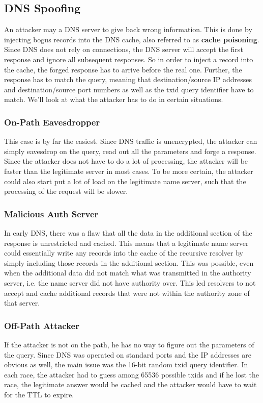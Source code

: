 \subsection{DNS Spoofing}
An attacker may a DNS server to give back wrong information. This is done by injecting bogus records into the DNS cache, also referred to as \textbf{cache poisoning}. Since DNS does not rely on connections, the DNS server will accept the first response and ignore all subsequent responses. So in order to inject a record into the cache, the forged response has to arrive before the real one. Further, the response has to match the query, meaning that destination/source IP addresses and destination/source port numbers as well as the txid query identifier have to match. We'll look at what the attacker has to do in certain situations.

\subsubsection{On-Path Eavesdropper}
This case is by far the easiest. Since DNS traffic is unencrypted, the attacker can simply eavesdrop on the query, read out all the parameters and forge a response. Since the attacker does not have to do a lot of processing, the attacker will be faster than the legitimate server in most cases. To be more certain, the attacker could also start put a lot of load on the legitimate name server, such that the processing of the request will be slower.

\subsubsection{Malicious Auth Server}
In early DNS, there was a flaw that all the data in the additional section of the response is unrestricted and cached. This means that a legitimate name server could essentially write any records into the cache of the recursive resolver by simply including those records in the additional section. This was possible, even when the additional data did not match what was transmitted in the authority server, i.e. the name server did not have authority over. This led resolvers to not accept and cache additional records that were not within the authority zone of that server.

\subsubsection{Off-Path Attacker}
If the attacker is not on the path, he has no way to figure out the parameters of the query. Since DNS was operated on standard ports and the IP addresses are obvious as well, the main issue was the 16-bit random txid query identifier. In each race, the attacker had to guess among 65536 possible txids and if he lost the race, the legitimate answer would be cached and the attacker would have to wait for the TTL to expire.\vspace{.3cm}\\

